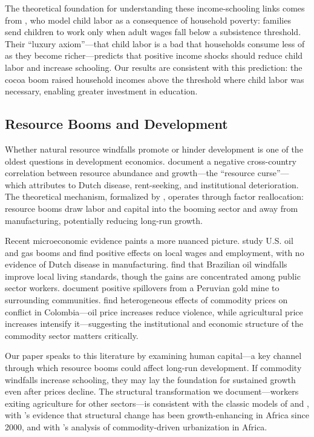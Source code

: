 \documentclass[12pt]{article}
\begin{document}
The theoretical foundation for understanding these income-schooling links comes from \citet{basu1998}, who model child labor as a consequence of household poverty: families send children to work only when adult wages fall below a subsistence threshold. Their ``luxury axiom''---that child labor is a bad that households consume less of as they become richer---predicts that positive income shocks should reduce child labor and increase schooling. Our results are consistent with this prediction: the cocoa boom raised household incomes above the threshold where child labor was necessary, enabling greater investment in education.

\subsection{Resource Booms and Development}

Whether natural resource windfalls promote or hinder development is one of the oldest questions in development economics. \citet{sachs2001} document a negative cross-country correlation between resource abundance and growth---the ``resource curse''---which \citet{vanderploeg2011} attributes to Dutch disease, rent-seeking, and institutional deterioration. The theoretical mechanism, formalized by \citet{corden1982}, operates through factor reallocation: resource booms draw labor and capital into the booming sector and away from manufacturing, potentially reducing long-run growth.

Recent microeconomic evidence paints a more nuanced picture. \citet{allcott2018} study U.S. oil and gas booms and find positive effects on local wages and employment, with no evidence of Dutch disease in manufacturing. \citet{aragoncaselli2013} find that Brazilian oil windfalls improve local living standards, though the gains are concentrated among public sector workers. \citet{aragon2013} document positive spillovers from a Peruvian gold mine to surrounding communities. \citet{dube2013} find heterogeneous effects of commodity prices on conflict in Colombia---oil price increases reduce violence, while agricultural price increases intensify it---suggesting the institutional and economic structure of the commodity sector matters critically.

Our paper speaks to this literature by examining human capital---a key channel through which resource booms could affect long-run development. If commodity windfalls increase schooling, they may lay the foundation for sustained growth even after prices decline. The structural transformation we document---workers exiting agriculture for other sectors---is consistent with the classic models of \citet{lewis1954} and \citet{harris1970}, with \citet{mcmillan2014}'s evidence that structural change has been growth-enhancing in Africa since 2000, and with \citet{gollin2016}'s analysis of commodity-driven urbanization in Africa.
\end{document}
